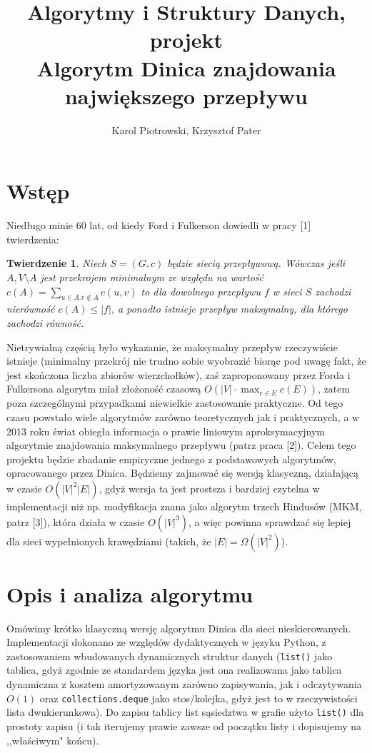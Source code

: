 \documentclass{article}
\author{Karol Piotrowski, Krzysztof Pater}
\title{Algorytmy i Struktury Danych, projekt\\ Algorytm Dinica znajdowania największego przepływu}
\newtheorem{twi}{Twierdzenie}
\begin{document}
\maketitle
\section{Wstęp}
Niedługo minie 60 lat, od kiedy Ford i Fulkerson dowiedli w pracy [1] twierdzenia:
\begin{twi} Niech $S=(G,c)$ będzie siecią przepływową. Wówczas jeśli $A, V\setminus A$ jest przekrojem minimalnym ze względu na wartość $c(A)=\sum_{u \in A. v\notin A} c(u,v)$ to dla dowolnego przepływu $f$ w sieci $S$ zachodzi nierówność $c(A) \leq |f|$, a ponadto istnieje przepływ maksymalny, dla którego zachodzi równość.
  \end{twi}
Nietrywialną częścią było wykazanie, że maksymalny przepływ rzeczywiście istnieje (minimalny przekrój nie trudno sobie wyobrazić biorąc pod uwagę fakt, że jest skończona liczba zbiorów wierzchołków), zaś zaproponowany przez Forda i Fulkersona algorytm miał złożoność czasową $O(|V|\cdot \max_{e\in E} c(E))$, zatem poza szczególnymi przypadkami niewielkie zastosowanie praktyczne. Od tego czasu powstało wiele algorytmów zarówno teoretycznych jak i praktycznych, a w 2013 roku świat obiegła informacja o prawie liniowym aproksymacyjnym algorytmie znajdowania maksymalnego przepływu (patrz praca [2]). Celem tego projektu będzie zbadanie empiryczne jednego z podstawowych algorytmów, opracowanego przez Dinica. Będziemy zajmować się wersją klasyczną, działającą w czasie $O(|V|^2|E|)$, gdyż wersja ta jest prostsza i bardziej czytelna w implementacji niż np. modyfikacja znana jako algorytm trzech Hindusów (MKM, patrz [3]), która działa w czasie $O(|V|^3)$, a więc powinna sprawdzać się lepiej dla sieci wypełnionych krawędziami (takich, że $|E| = \Omega(|V|^2)$). 

\section{Opis i analiza algorytmu}
  Omówimy krótko klasyczną wersję algorytmu Dinica dla sieci nieskierowanych. Implementacji dokonano ze względów dydaktycznych w języku Python, z zastosowaniem wbudowanych dynamicznych struktur danych (\texttt{list()} jako tablica, gdyż zgodnie ze standardem języka jest ona realizowana jako tablica dynamiczna z kosztem amortyzowanym zarówno zapisywania, jak i odczytywania $O(1)$ oraz \texttt{collections.deque} jako stos/kolejka, gdyż jest to w rzeczywistości lista dwukierunkowa). Do zapisu tablicy list sąsiedztwa w grafie użyto \texttt{list()} dla prostoty zapisu (i tak iterujemy prawie zawsze od początku listy i dopisujemy na ,,właściwym" końcu). 
  
\end{document}
